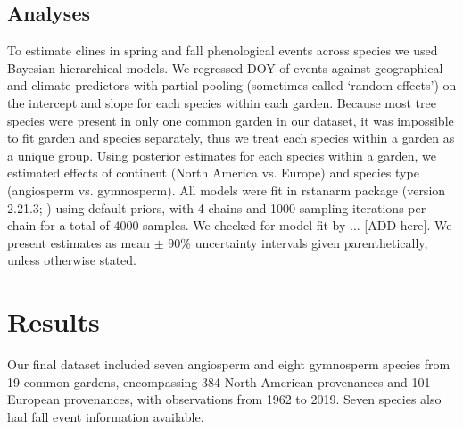 \documentclass{article}
\begin{document}
\subsection{Analyses}
To estimate clines in spring and fall phenological events across species we used Bayesian hierarchical models. We regressed DOY of events against geographical and climate predictors with partial pooling (sometimes called `random effects') on the intercept and slope for each species within each garden. Because most tree species were present in only one common garden in our dataset, it was impossible to fit garden and species separately, thus we treat each species within a garden as a unique group. Using posterior estimates for each species within a garden, we estimated effects of continent (North America vs. Europe) and species type (angiosperm vs. gymnosperm). All models were fit in rstanarm package (version 2.21.3; \citealp{brilleman2018}) using default priors, with 4 chains and 1000 sampling iterations per chain for a total of 4000 samples. We checked for model fit by ... [ADD here]. We present estimates as mean $\pm$ 90\% uncertainty intervals given parenthetically, unless otherwise stated. 

\section{Results}
Our final dataset included seven angiosperm and eight gymnosperm species from 19 common gardens, encompassing 384 North American provenances and 101 European provenances, with observations from 1962 to 2019. Seven species also had fall event information available. 
\end{document}
